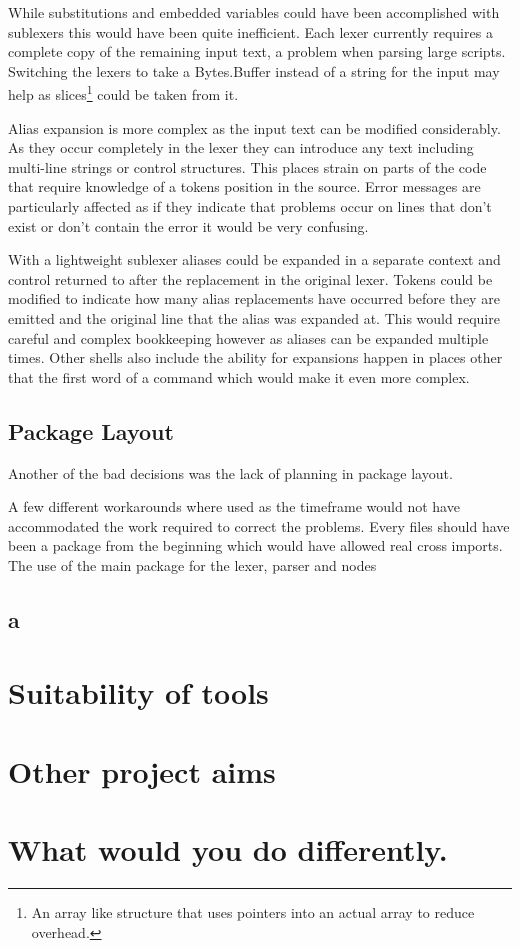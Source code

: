 While substitutions and embedded variables could have been accomplished with sublexers this would have been quite inefficient. 
Each lexer currently requires a complete copy of the remaining input text, a problem when parsing large scripts.
Switching the lexers to take a Bytes.Buffer instead of a string for the input may help as slices\footnote{An array like structure that uses pointers into an actual array to reduce overhead.} could be taken from it.

Alias expansion is more complex as the input text can be modified considerably.
As they occur completely in the lexer they can introduce any text including multi-line strings or control structures.
This places strain on parts of the code that require knowledge of a tokens position in the source.
Error messages are particularly affected as if they indicate that problems occur on lines that don't exist or don't contain the error it would be very confusing. 

With a lightweight sublexer aliases could be expanded in a separate context and control returned to after the replacement in the original lexer.
Tokens could be modified to indicate how many alias replacements have occurred before they are emitted and the original line that the alias was expanded at.
This would require careful and complex bookkeeping however as aliases can be expanded multiple times.
Other shells also include the ability for expansions happen in places other that the first word of a command which would make it even more complex.

\subsection{Package Layout}
Another of the bad decisions was the lack of planning in package layout.

A few different workarounds where used as the timeframe would not have accommodated the work required to correct the problems.
Every files should have been a package from the beginning which would have allowed real cross imports.
The use of the main package for the lexer, parser and nodes 



\subsection{a}


\section{Suitability of tools}

\section{Other project aims}

\section{What would you do differently.}













